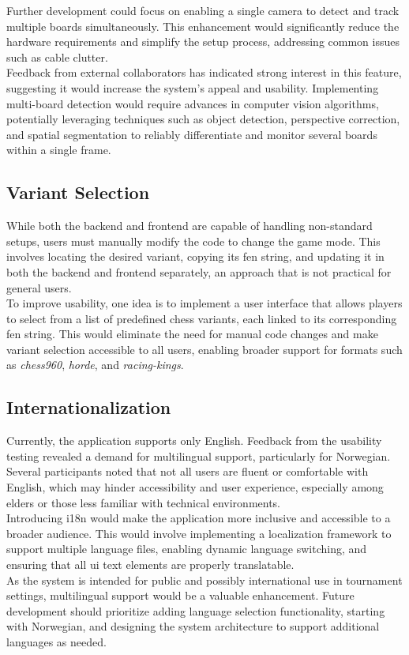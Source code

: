 Further development could focus on enabling a single camera to detect and track multiple boards simultaneously. This enhancement would significantly reduce the hardware requirements and simplify the setup process, addressing common issues such as cable clutter. \\

Feedback from external collaborators has indicated strong interest in this feature, suggesting it would increase the system's appeal and usability. Implementing multi-board detection would require advances in computer vision algorithms, potentially leveraging techniques such as object detection, perspective correction, and spatial segmentation to reliably differentiate and monitor several boards within a single frame.

\subsection{Variant Selection}
While both the backend and frontend are capable of handling non-standard setups, users must manually modify the code to change the game mode. This involves locating the desired variant, copying its \gls{fen} string, and updating it in both the backend and frontend separately, an approach that is not practical for general users. \\

To improve usability, one idea is to implement a user interface that allows players to select from a list of predefined chess variants, each linked to its corresponding \gls{fen} string. This would eliminate the need for manual code changes and make variant selection accessible to all users, enabling broader support for formats such as \textit{\gls{chess960}}, \textit{\gls{horde}}, and \textit{\gls{racing-kings}}.

\subsection{Internationalization}
Currently, the application supports only English. Feedback from the usability testing revealed a demand for multilingual support, particularly for Norwegian. Several participants noted that not all users are fluent or comfortable with English, which may hinder accessibility and user experience, especially among elders or those less familiar with technical environments. \\

Introducing \gls{i18n} would make the application more inclusive and accessible to a broader audience. This would involve implementing a localization framework to support multiple language files, enabling dynamic language switching, and ensuring that all \gls{ui} text elements are properly translatable. \\

As the system is intended for public and possibly international use in tournament settings, multilingual support would be a valuable enhancement. Future development should prioritize adding language selection functionality, starting with Norwegian, and designing the system architecture to support additional languages as needed.
